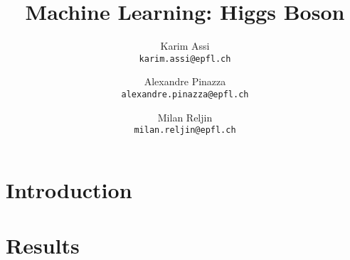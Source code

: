 \documentclass[10pt,conference,compsocconf]{IEEEtran}
\begin{document}
\title{Machine Learning: Higgs Boson}
\author{
  Karim Assi\\
  \texttt{karim.assi@epfl.ch}
  \and
  Alexandre Pinazza\\
  \texttt{alexandre.pinazza@epfl.ch}
  \and
  Milan Reljin\\
  \texttt{milan.reljin@epfl.ch}
}

\maketitle

    

\section{Introduction}

\section{Results}
\end{document}
